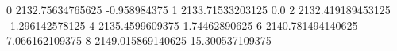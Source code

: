 0 2132.75634765625 -0.958984375
1 2133.71533203125 0.0
2 2132.419189453125 -1.296142578125
4 2135.4599609375 1.74462890625
6 2140.781494140625 7.066162109375
8 2149.015869140625 15.300537109375
